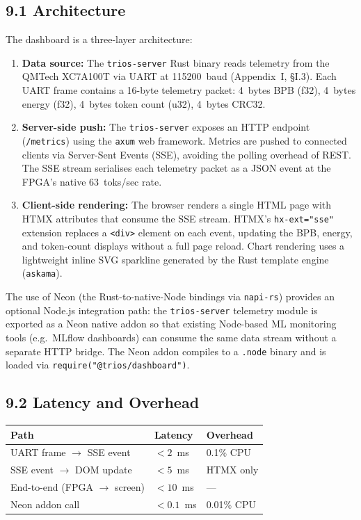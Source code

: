 \subsection{9.1 Architecture}\label{fa_09:dashboard-architecture}

The dashboard is a three-layer architecture:

\begin{enumerate}
\item \textbf{Data source:} The \texttt{trios-server}
Rust binary reads telemetry from the QMTech XC7A100T
via UART at 115200~baud (Appendix~I, \S I.3). Each
UART frame contains a 16-byte telemetry packet:
4~bytes BPB (f32), 4~bytes energy (f32), 4~bytes
token count (u32), 4~bytes CRC32.

\item \textbf{Server-side push:} The
\texttt{trios-server} exposes an HTTP endpoint
(\texttt{/metrics}) using the \texttt{axum} web
framework. Metrics are pushed to connected clients
via Server-Sent Events (SSE), avoiding the polling
overhead of REST. The SSE stream serialises each
telemetry packet as a JSON event at the FPGA's native
63~toks/sec rate.

\item \textbf{Client-side rendering:} The browser
renders a single HTML page with HTMX attributes that
consume the SSE stream. HTMX's \texttt{hx-ext="sse"}
extension replaces a \texttt{<div>} element on each
event, updating the BPB, energy, and token-count
displays without a full page reload. Chart rendering
uses a lightweight inline SVG sparkline generated by
the Rust template engine (\texttt{askama}).
\end{enumerate}

The use of Neon (the Rust-to-native-Node bindings via
\texttt{napi-rs}) provides an optional Node.js
integration path: the \texttt{trios-server} telemetry
module is exported as a Neon native addon so that
existing Node-based ML monitoring tools (e.g.\ MLflow
dashboards) can consume the same data stream without
a separate HTTP bridge. The Neon addon compiles to a
\texttt{.node} binary and is loaded via
\texttt{require("@trios/dashboard")}.

\subsection{9.2 Latency and
Overhead}\label{fa_09:dashboard-latency}

\begin{longtable}[]{@{}lll@{}}
\toprule\noalign{}
Path & Latency & Overhead \\
\midrule\noalign{}
\endhead
\bottomrule\noalign{}
\endlastfoot
UART frame $\to$ SSE event & $< 2$~ms & 0.1\% CPU \\
SSE event $\to$ DOM update & $< 5$~ms & HTMX only \\
End-to-end (FPGA $\to$ screen) & $< 10$~ms & --- \\
Neon addon call & $< 0.1$~ms & 0.01\% CPU \\
\end{longtable}


